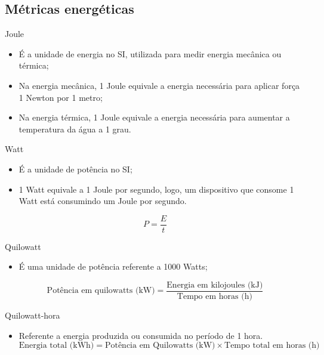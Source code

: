 \subsection{Métricas energéticas}

\begin{frame}{Joule}
    \begin{itemize}
        \item É a unidade de energia no SI, utilizada para medir energia mecânica ou térmica;
        \item Na energia mecânica, 1 Joule equivale a energia necessária para aplicar força 1 Newton por 1 metro;
        \item Na energia térmica, 1 Joule equivale a energia necessária para aumentar a temperatura da água a 1 grau.
    \end{itemize}

\end{frame}

\begin{frame}{Watt}
    \begin{itemize}
        \item É a unidade de potência no SI;
        \item 1 Watt equivale a 1 Joule por segundo, logo, um dispositivo que consome 1 Watt está consumindo um Joule por segundo.
    \end{itemize}
    \begin{equation}
        P = \frac{E}{t}
    \end{equation}
\end{frame}

\begin{frame}{Quilowatt}
    \begin{itemize}
        \item É uma unidade de potência referente a 1000 Watts;
    \end{itemize}
    \begin{equation}
        \text{Potência em quilowatts (kW)} = \frac{\text{Energia em kilojoules (kJ)}}{\text{Tempo em horas (h)}}
        \end{equation}
\end{frame}

\begin{frame}{Quilowatt-hora}
    \begin{itemize}
        \item Referente a energia produzida ou consumida no período de 1 hora.
        \begin{equation}
            \text{Energia total (kWh)} = \text{Potência em Quilowatts (kW)} \times \text{Tempo total em horas (h)}
            \end{equation}
    \end{itemize}
\end{frame}


